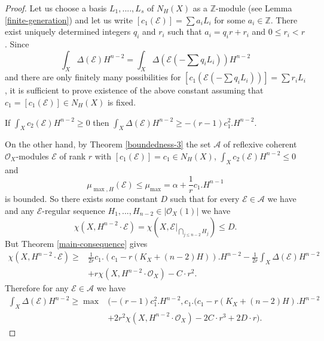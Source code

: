 \documentclass[10pt,a4paper]{amsart}
\newcommand{\ZZ}{{\mathbb Z}}
\newcommand{\cA}{{\mathcal A}}
\newcommand{\cE}{{\mathcal E}}
\newcommand{\cO}{{\mathcal O}}
\begin{document}
\begin{proof}
Let us choose a basis $L_1,....,L_s$ of $N_H (X)$ as a $\ZZ$-module (see Lemma \ref{finite-generation})
and let us write $[c_1 (\cE)]= \sum a_i L_i$ for some $a_i\in \ZZ$. There exist  uniquely determined integers $q_i$
and $r_i$ such that $a_i=q_i r+r_i$ and $0\le r_i <r$.
Since 
$$\int _X \Delta (\cE) H^{n-2}= \int _X \Delta (\cE (-\sum q_i L_i)) H^{n-2}$$
and there are only finitely many possibilities for  $[c_1 (\cE (-\sum q_i L_i))]= \sum r_i L_i$, it is sufficient to prove existence of the above constant assuming that $c_1=[c_1(\cE)]\in N_H (X)$ is fixed.

If $\int _X c_2 (\cE) H^{n-2}\ge 0$ then  $\int _X \Delta (\cE) H^{n-2}\ge - (r-1)c_1^2.H^{n-2}$.

On the other hand, by Theorem \ref{boundedness-3}  the set $\cA$ of reflexive coherent $\cO_X$-modules $\cE$ of rank $r$ with $[c_1(\cE)]=c_1\in N_H(X)$, $\int _X c_2 (\cE) H^{n-2}\le 0$  and $$\mu _{\max ,H } (\cE)\le \mu _{\max}= \alpha+\frac{1}{r}c_1.H^{n-1}$$ is bounded. So there exists some constant $D$ such that for every $\cE\in \cA$ we have
and any $\cE$-regular sequence $H_1,..., H_{n-2}\in |\cO_X (1)|$ we have
$$\chi (X, H^{n-2}\cdot \cE)=\chi (X, \cE |_{\bigcap _{j\le n-2} H_j })\le D.$$
But Theorem \ref{main-consequence} gives
\begin{align*}
\chi (X, H^{n-2} \cdot \cE) \ge &\frac{1}{2r}   c_1.(c_1-r(K_X+(n-2)H)). H^{n-2} 
 -\frac{1}{2r}\int _X \Delta (\cE)H^{n-2}   \\
 &  +r\chi (X, H^{n-2} \cdot \cO_X) - C\cdot r^2.
    \end{align*}
Therefore for any $\cE\in \cA$ we have
\begin{align*}
\int _X \Delta (\cE) H^{n-2}\ge \max &(- (r-1)c_1^2.H^{n-2} ,c_1 . (c_1 -r(K_X+(n-2)H).H^{n-2}\\
&+ 2r^2\chi (X, H^{n-2} \cdot \cO_X )-2C\cdot r^3 +2D\cdot r ).
\end{align*}
\end{proof}
\end{document}
